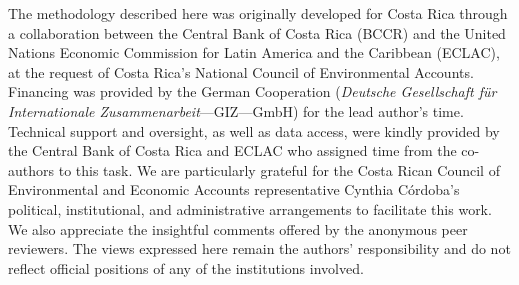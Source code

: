 \documentclass[
  letterpaper,
  DIV=11,
  numbers=noendperiod]{scrartcl}
\begin{document}
The methodology described here was originally developed for Costa Rica
through a collaboration between the Central Bank of Costa Rica (BCCR)
and the United Nations Economic Commission for Latin America and the
Caribbean (ECLAC), at the request of Costa Rica's National Council of
Environmental Accounts. Financing was provided by the German Cooperation
(\emph{Deutsche Gesellschaft für Internationale
Zusammenarbeit}---GIZ---GmbH) for the lead author's time. Technical
support and oversight, as well as data access, were kindly provided by
the Central Bank of Costa Rica and ECLAC who assigned time from the
co-authors to this task. We are particularly grateful for the Costa
Rican Council of Environmental and Economic Accounts representative
Cynthia Córdoba's political, institutional, and administrative
arrangements to facilitate this work. We also appreciate the insightful
comments offered by the anonymous peer reviewers. The views expressed
here remain the authors' responsibility and do not reflect official
positions of any of the institutions involved.
\end{document}
